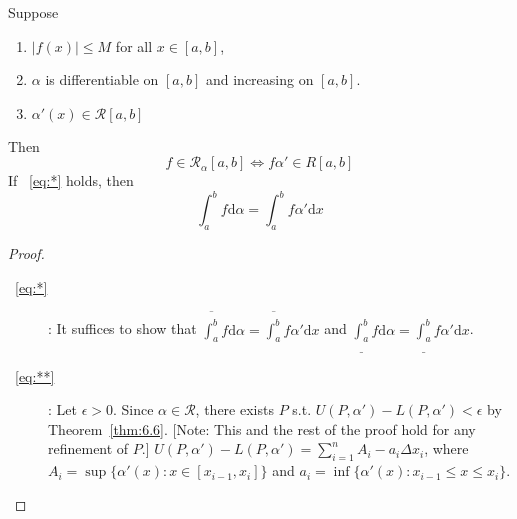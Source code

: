 \begin{thm}[17]
	Suppose
	\begin{enumerate}
		\item $|f(x)|\le M$ for all $x \in [a,b]$,
		\item $\alpha$ is differentiable on $[a,b]$ and increasing on $[a,b]$.
		\item $\alpha'(x) \in \mathscr{R}[a,b]$
	\end{enumerate}
	Then
	\begin{equation*}
		\label{eq:*}
		f \in \mathscr{R}_{\alpha}[a,b]\Leftrightarrow f \alpha' \in R[a,b] \tag{*}
	\end{equation*}
	If ~\eqref{eq:*} holds, then
	\begin{equation*}
		\label{eq:**}
		\int_{a}^{b}{f\mathrm{d}\alpha}=\int_{a}^{b}{f\alpha'\mathrm{d}x}\tag{**}
	\end{equation*}
	\begin{proof}
		\begin{description}
			\item[~\eqref{eq:*}]:
			      It suffices to show that $\overline{\int_{a}^{b}}{f\mathrm{d}\alpha}=\overline{\int_{a}^{b}}{f\alpha'\mathrm{d}x}$ and $\underline{\int_{a}^{b}}{f\mathrm{d}\alpha}=\underline{\int_{a}^{b}}{f\alpha'\mathrm{d}x}$.
			\item[~\eqref{eq:**}]:
			      Let $\epsilon>0$. Since $\alpha \in \mathscr{R}$, there exists $P$ s.t. $U(P,\alpha')-L(P,\alpha')<\epsilon$ by Theorem~\ref{thm:6.6}.
			      [Note: This and the rest of the proof hold for any refinement of $P$.]
			      $U(P,\alpha')-L(P,\alpha')=\sum_{i=1}^{n}{A_i-a_i}\Delta x_i$,
			      where $A_i=\sup\{\alpha'(x):x \in [x_{i-1},x_i]\}$ and $a_i=\inf\{\alpha'(x):x_{i-1}\le x\le x_i\}$.
		\end{description}
	\end{proof}
\end{thm}

